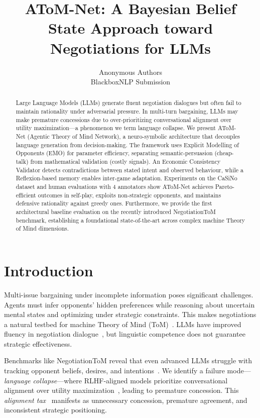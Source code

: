 \documentclass[11pt]{article}
\title{AToM-Net: A Bayesian Belief State Approach toward Negotiations for LLMs}
\author{
Anonymous Authors \\
BlackboxNLP Submission
}
\begin{document}
\maketitle

\begin{abstract}
Large Language Models (LLMs) generate fluent negotiation dialogues but often fail to maintain rationality under adversarial pressure. In multi-turn bargaining, LLMs may make premature concessions due to over-prioritizing conversational alignment over utility maximization—a phenomenon we term language collapse. We present AToM-Net (Agentic Theory of Mind Network), a neuro-symbolic architecture that decouples language generation from decision-making. The framework uses Explicit Modelling of Opponents (EMO) for parameter efficiency, separating semantic-persuasion (cheap-talk) from mathematical validation (costly signals). An Economic Consistency Validator detects contradictions between stated intent and observed behaviour, while a Reflexion-based memory enables inter-game adaptation. Experiments on the CaSiNo dataset and human evaluations with 4 annotators show AToM-Net achieves Pareto-efficient outcomes in self-play, exploits non-strategic opponents, and maintains defensive rationality against greedy ones. Furthermore, we provide the first architectural baseline evaluation on the recently introduced NegotiationToM benchmark, establishing a foundational state-of-the-art across complex machine Theory of Mind dimensions.

\end{abstract}

\section{Introduction}

Multi-issue bargaining under incomplete information poses significant challenges. Agents must infer opponents' hidden preferences while reasoning about uncertain mental states and optimizing under strategic constraints. This makes negotiations a natural testbed for machine Theory of Mind (ToM)~\cite{cleverhans,socialreasoning}. LLMs have improved fluency in negotiation dialogue~\cite{gpt3,llama,llama2}, but linguistic competence does not guarantee strategic effectiveness.

Benchmarks like NegotiationToM reveal that even advanced LLMs struggle with tracking opponent beliefs, desires, and intentions~\cite{negotiationtom}. We identify a failure mode—\textit{language collapse}—where RLHF-aligned models prioritize conversational alignment over utility maximization~\cite{rlhf,alignmenttax}, leading to premature concession. This \textit{alignment tax}~\cite{alignmenttax} manifests as unnecessary concession, premature agreement, and inconsistent strategic positioning.
\end{document}
